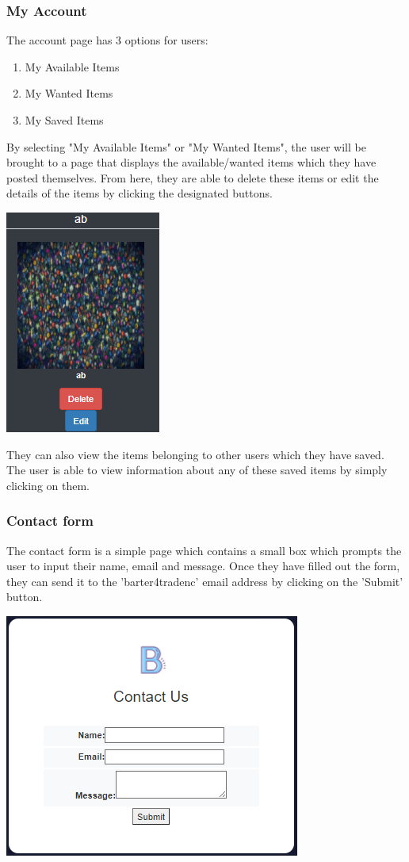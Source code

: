 \subsubsection{My Account}
The account page has 3 options for users:
\begin{enumerate}
  \item My Available Items
  \item My Wanted Items
  \item My Saved Items
\end{enumerate}
By selecting "My Available Items" or "My Wanted Items", the user will be brought to a page that displays the available/wanted items which they have posted themselves. From here, they are able to delete these items or edit the details of the items by clicking the designated buttons.
\par
\includegraphics{img/fe_editdelete.PNG}
\par
They can also view the items belonging to other users which they have saved. The user is able to view information about any of these saved items by simply clicking on them. 
\subsubsection{Contact form}
The contact form is a simple page which contains a small box which prompts the user to input their name, email and message. Once they have filled out the form, they can send it to the 'barter4tradenc' email address by clicking on the 'Submit' button.
\par
\includegraphics{img/fe_contact.PNG}
